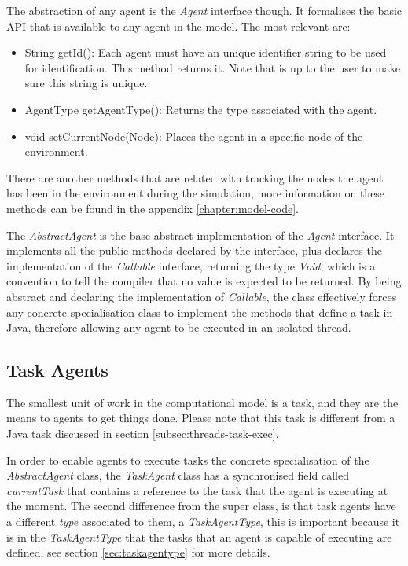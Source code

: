 The abstraction of any agent is the \emph{Agent} interface though. It formalises the basic \ac{API} that is available to any agent in the model. The most relevant are:

\begin{itemize}
  \item String getId(): Each agent must have an unique identifier string to be used for identification. This method returns it. Note that is up to the user to make sure this string is unique.
  
  \item AgentType getAgentType(): Returns the type associated with the agent.
  
  \item void setCurrentNode(Node): Places the agent in a specific node of the environment.
\end{itemize}

There are another methods that are related with tracking the nodes the agent has been in the environment during the simulation, more information on these methods can be found in the appendix \ref{chapter:model-code}.

The \emph{AbstractAgent} is the base abstract implementation of the \emph{Agent} interface. It implements all the public methods declared by the interface, plus declares the implementation of the \emph{Callable} interface, returning the type \emph{Void}, which is a convention to tell the compiler that no value is expected to be returned. By being abstract and declaring the implementation of \emph{Callable}, the class effectively forces any concrete specialisation class to implement the methods that define a task in Java, therefore allowing any agent to be executed in an isolated thread.

\subsection{Task Agents}

The smallest unit of work in the computational model is a task, and they are the means to agents to get things done. Please note that this task is different from a Java task discussed in section \ref{subsec:threads-task-exec}. 

In order to enable agents to execute tasks the concrete specialisation of the \emph{AbstractAgent} class, the \emph{TaskAgent} class has a synchronised field called \emph{currentTask} that contains a reference to the task that the agent is executing at the moment. The second difference from the super class, is that task agents have a different \emph{type} associated to them, a \emph{TaskAgentType}, this is important because it is in the \emph{TaskAgentType} that the tasks that an agent is capable of executing are defined, see section \ref{sec:taskagentype} for more details.

